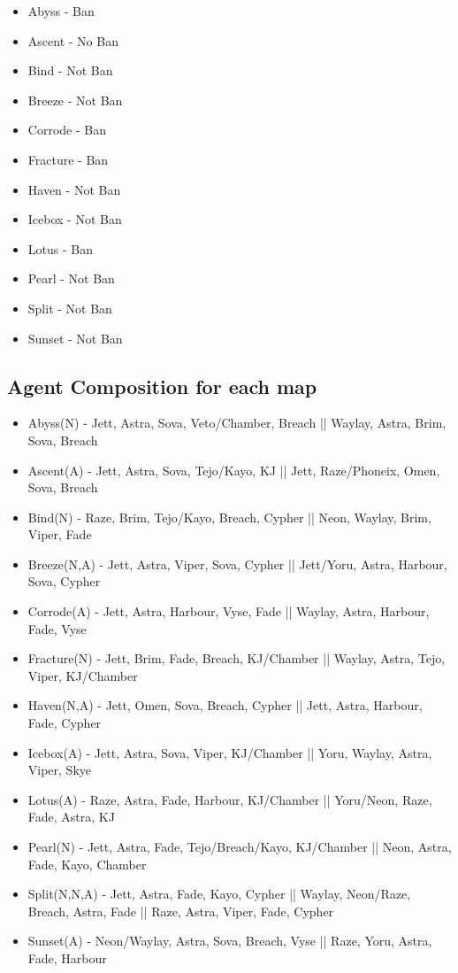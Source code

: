\documentclass[letterpaper,11pt]{article}
\begin{document}
\begin{itemize}[left=0.15in, itemsep=-4pt]
\item Abyss - Ban
\item Ascent - No Ban
\item Bind - Not Ban
\item Breeze - Not Ban
\item Corrode - Ban
\item Fracture - Ban
\item Haven - Not Ban
\item Icebox - Not Ban
\item Lotus - Ban
\item Pearl - Not Ban
\item Split - Not Ban
\item Sunset - Not Ban

\end{itemize}

\begin{center}
\section{\textbf{Agent Composition for each map}}
\end{center}

\begin{itemize}[left=0.15in, itemsep=-4pt]
	\item Abyss(N) - Jett, Astra, Sova, Veto/Chamber, Breach || Waylay, Astra, Brim,  Sova, Breach
	\item Ascent(A) - Jett, Astra, Sova, Tejo/Kayo, KJ || Jett, Raze/Phoneix, Omen, Sova, Breach
	\item Bind(N) - Raze, Brim, Tejo/Kayo, Breach, Cypher || Neon, Waylay, Brim, Viper, Fade
	\item Breeze(N,A) - Jett, Astra, Viper, Sova, Cypher || Jett/Yoru, Astra, Harbour, Sova, Cypher 
	\item Corrode(A) - Jett, Astra, Harbour, Vyse, Fade || Waylay, Astra, Harbour, Fade, Vyse
	\item Fracture(N) - Jett, Brim, Fade, Breach, KJ/Chamber || Waylay, Astra, Tejo, Viper, KJ/Chamber
	\item Haven(N,A) - Jett, Omen, Sova, Breach, Cypher || Jett, Astra, Harbour, Fade, Cypher
	\item Icebox(A) - Jett, Astra, Sova, Viper, KJ/Chamber  || Yoru, Waylay, Astra, Viper, Skye
	\item Lotus(A) - Raze, Astra, Fade, Harbour, KJ/Chamber || Yoru/Neon, Raze, Fade, Astra, KJ
	\item Pearl(N) - Jett, Astra, Fade, Tejo/Breach/Kayo, KJ/Chamber || Neon, Astra, Fade, Kayo, Chamber
	\item Split(N,N,A) - Jett, Astra, Fade, Kayo, Cypher || Waylay, Neon/Raze, Breach, Astra, Fade || Raze, Astra, Viper, Fade, Cypher
	\item Sunset(A) - Neon/Waylay, Astra, Sova, Breach, Vyse  || Raze, Yoru, Astra, Fade, Harbour
	
\end{itemize}
\clearpage
\end{document}
